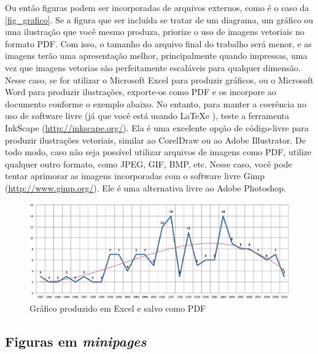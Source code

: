 Ou então figuras podem ser incorporadas de arquivos externos, como é o caso da
\autoref{fig_grafico}. Se a figura que ser incluída se tratar de um diagrama, um
gráfico ou uma ilustração que você mesmo produza, priorize o uso de imagens
vetoriais no formato PDF. Com isso, o tamanho do arquivo final do trabalho será
menor, e as imagens terão uma apresentação melhor, principalmente quando
impressas, uma vez que imagens vetorias são perfeitamente escaláveis para
qualquer dimensão. Nesse caso, se for utilizar o Microsoft Excel para produzir
gráficos, ou o Microsoft Word para produzir ilustrações, exporte-os como PDF e
os incorpore ao documento conforme o exemplo abaixo. No entanto, para manter a
coerência no uso de software livre (já que você está usando \LaTeX e \abnTeX),
teste a ferramenta \textsf{InkScape}
(\url{http://inkscape.org/}). Ela é uma excelente opção de código-livre para
produzir ilustrações vetoriais, similar ao CorelDraw ou ao Adobe
Illustrator. De todo modo, caso não seja possível
utilizar arquivos de imagens como PDF, utilize qualquer outro formato, como
JPEG, GIF, BMP, etc. Nesse caso, você pode tentar aprimorar as imagens
incorporadas com o software livre \textsf{Gimp}
(\url{http://www.gimp.org/}). Ele é uma alternativa livre ao Adobe
Photoshop.

\begin{figure}[htb]
	\caption{\label{fig_grafico}Gráfico produzido em Excel e salvo como PDF}
	\begin{center}
	    \includegraphics[scale=0.5]{abntex2-modelo-img-grafico.pdf}
	\end{center}
\end{figure}

\subsection{Figuras em \emph{minipages}}


